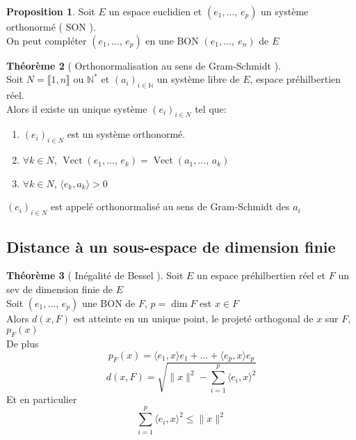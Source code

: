 \documentclass[10pt,a4paper]{article}
\theoremstyle{definition}
\newtheorem{proposition}{Proposition}[section]
\newtheorem{theorem}[proposition]{Théorème}
\DeclareMathOperator{\vect}{Vect}
\begin{document}
\begin{proposition}
    Soit \(E\) un espace euclidien et \((e_1, ...,\, e_p)\) un système orthonormé ( SON ). \\
    On peut compléter \((e_1, ...,\, e_p)\) en une BON \((e_1, ...,\ e_n)\) de \(E\)
\end{proposition}
\begin{theorem}[ Orthonormalisation au sens de Gram-Schmidt ]
    \hfill \\
    Soit \(N = \llbracket 1, n \rrbracket\) ou \(\mathbb{N}^*\) et \((a_i)_{i \in \mathbb{N}}\) un système libre de \(E\), espace préhilbertien réel. \\
    Alors il existe un unique système \((e_i)_{i \in N}\) tel que:
    \begin{enumerate}
        \item \((e_i)_{i \in N}\) est un système orthonormé.
        \item \(\forall k \in N\), \(\vect(e_1, ...,\, e_k) = \vect(a_1, ...,\, a_k)\)
        \item \(\forall k \in N\), \(\langle e_k, a_k \rangle > 0\) 
    \end{enumerate}
    \((e_i)_{i \in N}\) est appelé orthonormalisé au sens de Gram-Schmidt des \(a_i\)
\end{theorem}

\subsection{Distance à un sous-espace de dimension finie}
\begin{theorem}[ Inégalité de Bessel ]
    Soit \(E\) un espace préhilbertien réel et \(F\) un sev de dimension finie de \(E\) \\
    Soit \((e_1, ...,\, e_p)\) une BON de \(F\), \(p = \dim F\) est \(x \in F\) \\
    Alors \(d(x, F)\) est atteinte en un unique point, le projeté orthogonal de \(x\) sur \(F\), \(p_F(x)\) \\
    De plus
    \[p_F(x) = \langle e_1, x \rangle e_1 + ... + \langle e_p, x \rangle e_p\]
    \[d(x, F) = \sqrt{\lVert x \rVert^2 - \sum_{i = 1}^{p} \langle e_i, x \rangle^2}\]
    Et en particulier
    \[\sum_{i = 1}^{p} \langle e_i, x \rangle^2 \leq \lVert x \rVert^2\]
\end{theorem}
\end{document}
